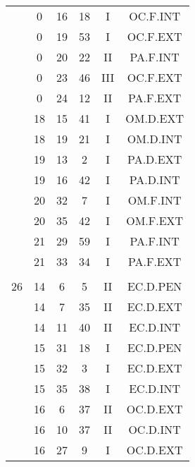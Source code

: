\documentclass[12pt, a4paper]{article}
\begin{document}
\begin{multicols}{3}
{\begin{tabular}{c c c c c c}
	 	 	 	 & 0 & 16 & 18 & I & OC.F.INT\\%
	 	 	 	 & 0 & 19 & 53 & I & OC.F.EXT\\%
	 	 	 	 & 0 & 20 & 22 & II & PA.F.INT\\%
	 	 	 	 & 0 & 23 & 46 & III & OC.F.EXT\\%
	 	 	 	 & 0 & 24 & 12 & II & PA.F.EXT\\%
	 	 	 	 & 18 & 15 & 41 & I & OM.D.EXT\\%
	 	 	 	 & 18 & 19 & 21 & I & OM.D.INT\\%
	 	 	 	 & 19 & 13 & 2 & I & PA.D.EXT\\%
	 	 	 	 & 19 & 16 & 42 & I & PA.D.INT\\%
	 	 	 	 & 20 & 32 & 7 & I & OM.F.INT\\%
	 	 	 	 & 20 & 35 & 42 & I & OM.F.EXT\\%
	 	 	 	 & 21 & 29 & 59 & I & PA.F.INT\\%
	 	 	 	 & 21 & 33 & 34 & I & PA.F.EXT\\%
	 	 	 	 & & & & & \\%
	 	 	 	26 & 14 & 6 & 5 & II & EC.D.PEN\\%
	 	 	 	 & 14 & 7 & 35 & II & EC.D.EXT\\%
	 	 	 	 & 14 & 11 & 40 & II & EC.D.INT\\%
	 	 	 	 & 15 & 31 & 18 & I & EC.D.PEN\\%
	 	 	 	 & 15 & 32 & 3 & I & EC.D.EXT\\%
	 	 	 	 & 15 & 35 & 38 & I & EC.D.INT\\%
	 	 	 	 & 16 & 6 & 37 & II & OC.D.EXT\\%
	 	 	 	 & 16 & 10 & 37 & II & OC.D.INT\\%
	 	 	 	 & 16 & 27 & 9 & I & OC.D.EXT\\%

\end{tabular}}
\end{multicols}
\end{document}
